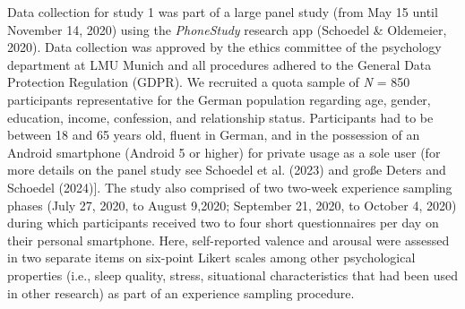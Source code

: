 \documentclass[
  english,
  man,floatsintext]{apa6}
\begin{document}
Data collection for study 1 was part of a large panel study (from May 15 until November 14, 2020) using the \emph{PhoneStudy} research app (Schoedel \& Oldemeier, 2020). Data collection was approved by the ethics committee of the psychology department at LMU Munich and all procedures adhered to the General Data Protection Regulation (GDPR). We recruited a quota sample of \emph{N} = 850 participants representative for the German population regarding age, gender, education, income, confession, and relationship status. Participants had to be between 18 and 65 years old, fluent in German, and in the possession of an Android smartphone (Android 5 or higher) for private usage as a sole user (for more details on the panel study see Schoedel et al. (2023) and große Deters and Schoedel (2024){]}. The study also comprised of two two-week experience sampling phases (July 27, 2020, to August 9,2020; September 21, 2020, to October 4, 2020) during which participants received two to four short questionnaires per day on their personal smartphone. Here, self-reported valence and arousal were assessed in two separate items on six-point Likert scales among other psychological properties (i.e., sleep quality, stress, situational characteristics that had been used in other research) as part of an experience sampling procedure.
\end{document}
